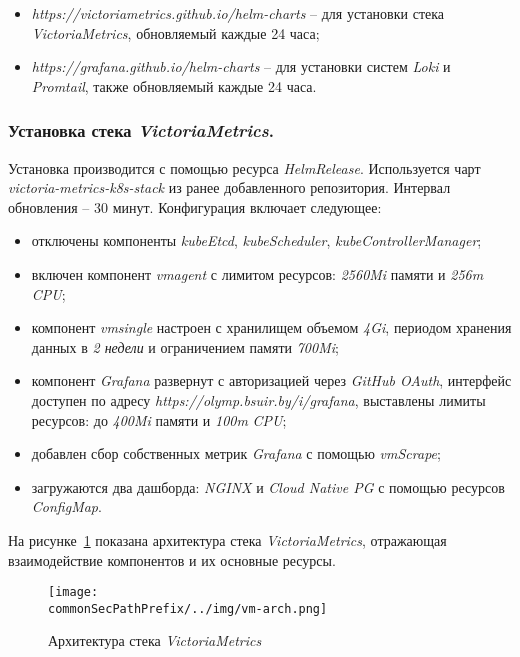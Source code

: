 \begin{itemize}
    \item \textit{https://victoriametrics.github.io/helm-charts} -- для установки стека \textit{VictoriaMetrics}, обновляемый каждые 24 часа;
    \item \textit{https://grafana.github.io/helm-charts} -- для установки систем \textit{Loki} и \textit{Promtail}, также обновляемый каждые 24 часа.
\end{itemize}

\subsubsection{Установка стека \textit{VictoriaMetrics}.} Установка производится с помощью ресурса \textit{HelmRelease}. Используется чарт \textit{victoria-metrics-k8s-stack} из ранее добавленного репозитория. Интервал обновления -- 30 минут. Конфигурация включает следующее:

\begin{itemize}
    \item отключены компоненты \textit{kubeEtcd}, \textit{kubeScheduler}, \textit{kubeControllerManager};
    \item включен компонент \textit{vmagent} с лимитом ресурсов: \textit{2560Mi} памяти и \textit{256m} \textit{CPU};
    \item компонент \textit{vmsingle} настроен с хранилищем объемом \textit{4Gi}, периодом хранения данных в \textit{2 недели} и ограничением памяти \textit{700Mi};
    \item компонент \textit{Grafana} развернут с авторизацией через \textit{GitHub OAuth}, интерфейс доступен по адресу \textit{https://olymp.bsuir.by/i/grafana}, выставлены лимиты ресурсов: до \textit{400Mi} памяти и \textit{100m} \textit{CPU};
    \item добавлен сбор собственных метрик \textit{Grafana} с помощью \textit{vmScrape};
    \item загружаются два дашборда: \textit{NGINX} и \textit{Cloud Native PG} с помощью ресурсов \textit{ConfigMap}.
\end{itemize}

На рисунке~\ref{fig:vmstack-architecture} показана архитектура стека \textit{VictoriaMetrics}, отражающая взаимодействие компонентов и их основные ресурсы.

\begin{figure}[ht]
    \centering
    \texttt{[image: \\commonSecPathPrefix/../img/vm-arch.png]}
    \caption{Архитектура стека \textit{VictoriaMetrics}}
    \label{fig:vmstack-architecture}
\end{figure}

